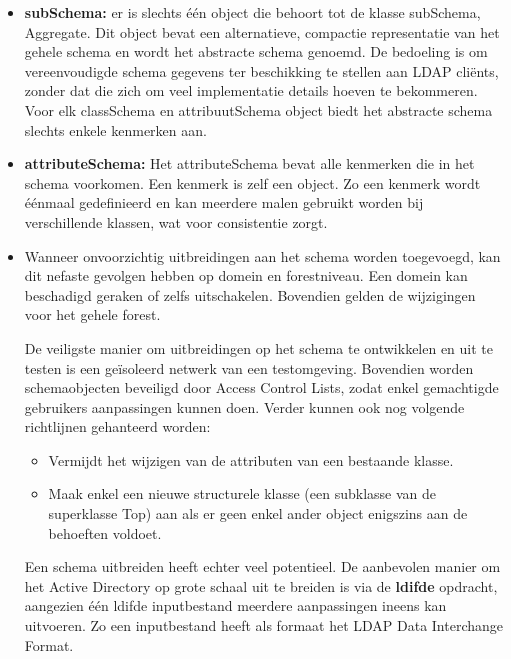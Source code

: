 \begin{enumerate}
		{ 
			\begin{itemize}
				\item \textbf{subSchema:} er is slechts één object die behoort tot de klasse subSchema, Aggregate. Dit object bevat een alternatieve, compactie representatie van het gehele schema en wordt het abstracte schema genoemd. De bedoeling is om vereenvoudigde schema gegevens ter beschikking te stellen aan LDAP cliënts, zonder dat die zich om veel implementatie details hoeven te bekommeren. Voor elk classSchema en attribuutSchema object biedt het abstracte schema slechts enkele kenmerken aan. 
				\item \textbf{attributeSchema:} Het attributeSchema bevat alle kenmerken die in het schema voorkomen. Een kenmerk is zelf een object. Zo een kenmerk wordt éénmaal gedefinieerd en kan meerdere malen gebruikt worden bij verschillende klassen, wat voor consistentie zorgt.
			\end{itemize}
		}
		
		 { 
			\begin{itemize}
				\item Wanneer onvoorzichtig uitbreidingen aan het schema worden toegevoegd, kan dit nefaste gevolgen hebben op domein en forestniveau. Een domein kan beschadigd geraken of zelfs uitschakelen. Bovendien gelden de wijzigingen voor het gehele forest.
				
				De veiligste manier om uitbreidingen op het schema te ontwikkelen en uit te testen is een geïsoleerd netwerk van een testomgeving. Bovendien worden schemaobjecten beveiligd door Access Control Lists, zodat enkel gemachtigde gebruikers aanpassingen kunnen doen. Verder kunnen ook nog volgende richtlijnen gehanteerd worden:
				\begin{itemize}
					\item Vermijdt het wijzigen van de attributen van een bestaande klasse.
					\item Maak enkel een nieuwe structurele klasse (een subklasse van de superklasse Top) aan als er geen enkel ander object enigszins aan de behoeften voldoet.
				\end{itemize}
				
				Een schema uitbreiden heeft echter veel potentieel. De aanbevolen manier om het Active Directory op grote schaal uit te breiden is via de \textbf{ldifde} opdracht, aangezien één ldifde inputbestand meerdere aanpassingen ineens kan uitvoeren. Zo een inputbestand heeft als formaat het LDAP Data Interchange Format.
			\end{itemize}
		}
	\end{enumerate}
	
